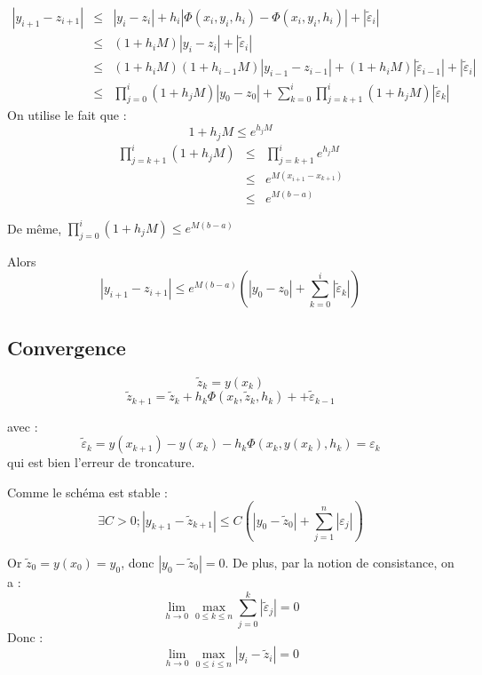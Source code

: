 
\begin{dem}
	\begin{eqnarray*}
		|y_{i+1}-z_{i+1}|&\leq& |y_i-z_i|+h_i|\Phi(x_i,y_i,h_i)-\Phi(x_i, y_i, h_i)|+|\tilde{\varepsilon}_i|\\
				&\leq& (1+h_iM)|y_i-z_i| + |\tilde{\varepsilon}_i|\\
				&\leq& (1+h_iM)(1+h_{i-1}M)|y_{i-1}-z_{i-1}| + (1+h_iM)|\tilde{\varepsilon}_{i-1}|+|\tilde{\varepsilon}_i|\\
				&\leq& \prod_{j=0}^i(1+h_jM)|y_0-z_0| + \sum_{k=0}^i \prod_{j=k+1}^i (1+h_jM)|\tilde{\varepsilon}_k|
	\end{eqnarray*}
	On utilise le fait que :
	\[1+h_jM \leq e^{h_jM}\]
	\begin{eqnarray*}
		\prod_{j=k+1}^i (1+h_jM) &\leq& \prod_{j=k+1}^i e^{h_jM}\\
					&\leq& e^{M(x_{i+1}-x_{k+1})}\\
					&\leq& e^{M(b-a)}
	\end{eqnarray*}

	De même, $\prod_{j=0}^i (1+h_jM)\leq e^{M(b-a)}$

	Alors \[|y_{i+1}-z_{i+1}|\leq e^{M(b-a)}\left(|y_0-z_0|+\sum_{k=0}^i|\tilde{\varepsilon}_k|\right)\]
\end{dem}

\subsection{Convergence}


\begin{dem}
	\[\tilde{z}_k=y(x_k)\]
	\[\tilde{z}_{k+1}=\tilde{z}_k + h_k\Phi(x_k,\tilde{z}_k,h_k)++\tilde{\varepsilon}_{k-1}\]

	avec :
	\[\tilde{\varepsilon}_k=y(x_{k+1}) -y(x_k)-h_k\Phi(x_k,y(x_k),h_k)=\varepsilon_k\]
	qui est bien l'erreur de troncature.

	\bigskip
	Comme le schéma est stable :
	\[\exists C>0; |y_{k+1}-\tilde{z}_{k+1}|\leq C\left(|y_0-\tilde{z}_0|+\sum_{j=1}^n|\varepsilon_j|\right)\]

	Or $\tilde{z}_0=y(x_0)=y_0$, donc $|y_0-\tilde{z}_0|=0$. De plus, par la notion de consistance, on a :
	\[\lim_{h\to 0} \max_{0\leq k\leq n} \sum_{j=0}^k |\tilde{\varepsilon}_j|=0\]
	Donc :
	\[\lim_{h\to 0} \max_{0\leq i\leq n} |y_i-\tilde{z}_i|=0\]
\end{dem}

